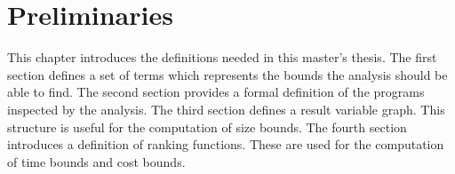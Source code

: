 \chapter{Preliminaries}

This chapter introduces the definitions needed in this master's thesis.
The first section defines a set of terms which represents the bounds the analysis should be able to find. 
The second section provides a formal definition of the programs inspected by the analysis.
The third section defines a result variable graph.
This structure is useful for the computation of size bounds.
The fourth section introduces a definition of ranking functions.
These are used for the computation of time bounds and cost bounds.









